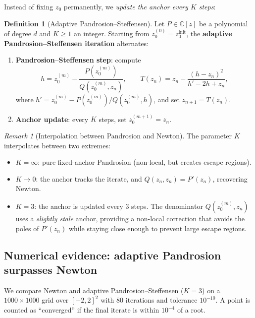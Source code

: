 \documentclass[10pt,a4paper,oneside]{book}
\theoremstyle{definition}
\newtheorem{definition}[theorem]{Definition}
\theoremstyle{remark}
\newtheorem{remark}[theorem]{Remark}
\newcommand{\CC}{\mathbb{C}}
\begin{document}
Instead of fixing $z_0$ permanently, we \emph{update the anchor every $K$ steps}:

\begin{definition}[Adaptive Pandrosion--Steffensen]
\label{def:adaptive}
Let $P \in \CC[z]$ be a polynomial of degree $d$ and $K \geq 1$ an integer.  Starting from $z_0^{(0)} = z_0^{\mathrm{init}}$, the \textbf{adaptive Pandrosion--Steffensen iteration} alternates:
\begin{enumerate}
  \item \textbf{Pandrosion--Steffensen step}: compute
  \[
    h = z_0^{(m)} - \frac{P(z_0^{(m)})}{Q(z_0^{(m)}, z_n)}, \qquad
    T(z_n) = z_n - \frac{(h - z_n)^2}{h' - 2h + z_n},
  \]
  where $h' = z_0^{(m)} - P(z_0^{(m)})/Q(z_0^{(m)}, h)$, and set $z_{n+1} = T(z_n)$.
  \item \textbf{Anchor update}: every $K$ steps, set $z_0^{(m+1)} = z_n$.
\end{enumerate}
\end{definition}

\begin{remark}[Interpolation between Pandrosion and Newton]
The parameter $K$ interpolates between two extremes:
\begin{itemize}
  \item $K = \infty$: pure fixed-anchor Pandrosion (non-local, but creates escape regions).
  \item $K \to 0$: the anchor tracks the iterate, and $Q(z_n, z_n) = P'(z_n)$, recovering Newton.
  \item $K = 3$: the anchor is updated every 3 steps.  The denominator $Q(z_0^{(m)}, z_n)$ uses a \emph{slightly stale} anchor, providing a non-local correction that avoids the poles of $P'(z_n)$ while staying close enough to prevent large escape regions.
\end{itemize}
\end{remark}

\subsection{Numerical evidence: adaptive Pandrosion surpasses Newton}

We compare Newton and adaptive Pandrosion--Steffensen ($K = 3$) on a $1000 \times 1000$ grid over $[-2,2]^2$ with $80$ iterations and tolerance $10^{-10}$.  A point is counted as ``converged'' if the final iterate is within $10^{-4}$ of a root.
\end{document}
